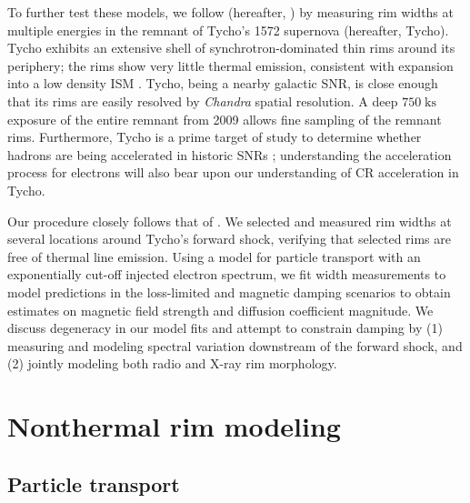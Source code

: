 \documentclass[iop, apj, numberedappendix]{emulateapj}
\newcommand*{\mt}{\mathrm}
\newcommand*{\unit}[1]{\;\mt{#1}}  %
\begin{document}
To further test these models, we follow \citet{ressler2014} (hereafter,
) by measuring rim widths at multiple energies in the
remnant of Tycho's 1572 supernova (hereafter, Tycho).  Tycho exhibits an
extensive shell of synchrotron-dominated thin rims around its periphery; the
rims show very little thermal emission, consistent with expansion into a low
density ISM \citep{williams2013}.  Tycho, being a nearby galactic SNR, is close
enough that its rims are easily resolved by \textit{Chandra} spatial
resolution. A deep $750 \unit{ks}$ exposure of the entire remnant from 2009
allows fine sampling of the remnant rims.  Furthermore, Tycho
is a prime target of study to determine whether hadrons are being accelerated
in historic SNRs \citep[and references therein]{morlino2012}; understanding the
acceleration process for electrons will also bear upon our understanding of CR
acceleration in Tycho.

Our procedure closely follows that of .
We selected and measured rim widths at several locations around Tycho's forward
shock, verifying that selected rims are free of thermal line emission.  Using a
model for particle transport with an exponentially cut-off injected electron
spectrum, we fit width measurements to model predictions in the loss-limited
and magnetic damping scenarios to obtain estimates on magnetic field strength
and diffusion coefficient magnitude.  We discuss degeneracy in our model fits
and attempt to constrain damping by (1) measuring and modeling spectral variation
downstream of the forward shock, and (2) jointly modeling both radio and X-ray
rim morphology.

\section{Nonthermal rim modeling}\label{sec:models}

\subsection{Particle transport}\label{sec:transport}
\end{document}
